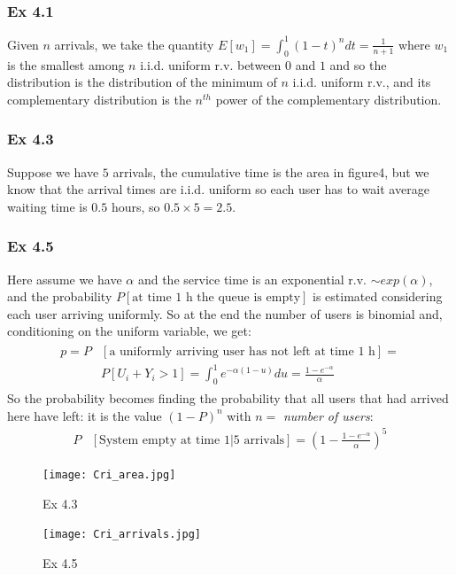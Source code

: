 	\subsubsection*{Ex 4.1}
	Given $n$ arrivals, we take the quantity $E[w_1] = \int_{0}^{1}(1-t)^n dt = \frac{1}{n+1}$ where $w_1$ is the smallest among $n$ i.i.d. uniform r.v. between $0$ and $1$ and so the distribution is the distribution of the minimum of $n$ i.i.d. uniform r.v., and its complementary distribution is the $n^{th}$ power of the complementary distribution.\\
	\subsubsection*{Ex 4.3}
	Suppose we have $5$ arrivals, the cumulative time is the area in figure4, but we know that the arrival times are i.i.d. uniform so each user has to wait average waiting time is $0.5$ hours, so $0.5\times5 = 2.5$.\\
	\subsubsection*{Ex 4.5}
	Here assume we have $\alpha$  and the service time is an exponential r.v. $\sim exp(\alpha)$, and the probability $P[\text{at time 1 h the queue is empty}]$ is estimated considering each user arriving uniformly. So at the end the number of users is binomial and, conditioning on the uniform variable, we get:
	\begin{align}
	\begin{split}
	p = P & [\text{a uniformly arriving user has not left at time 1 h}] =\\
	& P[U_i + Y_i > 1] = \int_{0}^{1}e^{-\alpha(1-u)}du = \frac{1-e^{-\alpha}}{\alpha}
	\end{split}
	\end{align}
	So the probability becomes finding the probability that all users that had arrived here have left: it is the value $(1-P)^{n}$ with $n = $ \textit{number of users}:
	\begin{align}
	P&[\text{System empty at time 1|5 arrivals}] = (1-\frac{1-e^{-\alpha}}{\alpha})^5
	\end{align}
	\begin{figure}[h]
	\begin{minipage}[c]{0.5\textwidth}
	\texttt{[image: Cri\_area.jpg]}
	\caption{Ex 4.3}
	\end{minipage}
	\hspace{10mm}
	\label{fig:area}
	\begin{minipage}[c]{0.5\textwidth}
	\texttt{[image: Cri\_arrivals.jpg]}
	\caption{Ex 4.5}
	\end{minipage}
	\end{figure}

